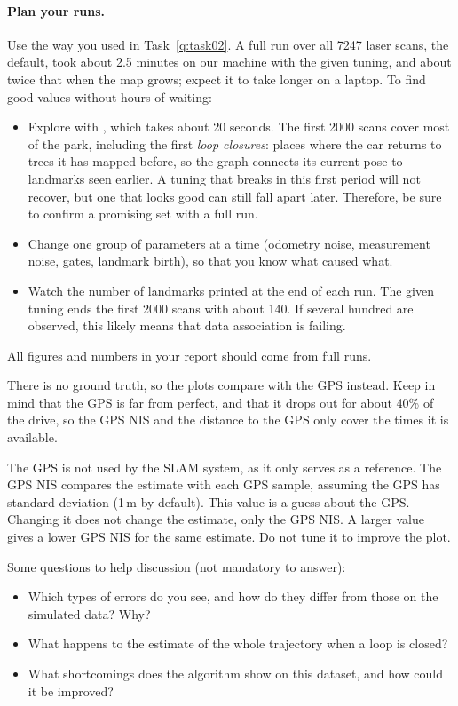\paragraph{Plan your runs.} Use  the way you used  in Task~\ref{q:task02}. A full run over all 7247 laser scans, the default, took about 2.5 minutes on our machine with the given tuning, and about twice that when the map grows; expect it to take longer on a laptop. To find good values without hours of waiting:
\begin{itemize}
    \item Explore with , which takes about 20 seconds. The first 2000 scans cover most of the park, including the first \emph{loop closures}: places where the car returns to trees it has mapped before, so the graph connects its current pose to landmarks seen earlier. A tuning that breaks in this first period will not recover, but one that looks good can still fall apart later. Therefore, be sure to confirm a promising set with a full run.
    \item Change one group of parameters at a time (odometry noise, measurement noise, gates, landmark birth), so that you know what caused what.
    \item Watch the number of landmarks printed at the end of each run. The given tuning ends the first 2000 scans with about 140. If several hundred are observed, this likely means that data association is failing.
\end{itemize}
All figures and numbers in your report should come from full runs.

There is no ground truth, so the plots compare with the GPS instead. Keep in mind that the GPS is far from perfect, and that it drops out for about 40\% of the drive, so the GPS NIS and the distance to the GPS only cover the times it is available.

The GPS is not used by the SLAM system, as it only serves as a reference. The GPS NIS compares the estimate with each GPS sample, assuming the GPS has standard deviation  (1\,m by default). This value is a guess about the GPS. Changing it does not change the estimate, only the GPS NIS. A larger value gives a lower GPS NIS for the same estimate. Do not tune it to improve the plot.

\hfill

Some questions to help discussion (not mandatory to answer):
\begin{itemize}
    \item Which types of errors do you see, and how do they differ from those on the simulated data? Why?
    \item What happens to the estimate of the whole trajectory when a loop is closed?
    \item What shortcomings does the algorithm show on this dataset, and how could it be improved?
\end{itemize}
